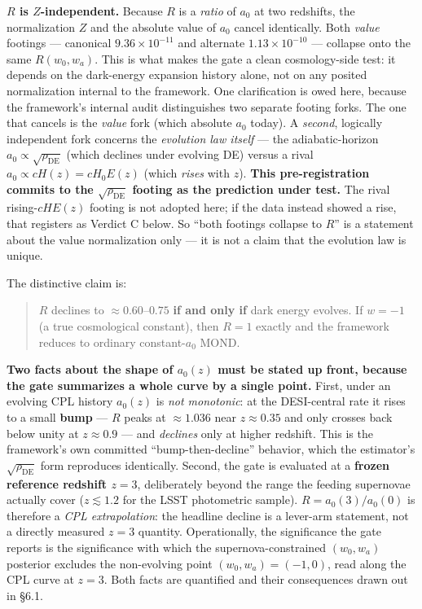 \documentclass[
]{article}
\begin{document}
\textbf{\(R\) is \(Z\)-independent.} Because \(R\) is a \emph{ratio} of
\(a_0\) at two redshifts, the normalization \(Z\) and the absolute value
of \(a_0\) cancel identically. Both \emph{value} footings --- canonical
\(9.36\times10^{-11}\) and alternate \(1.13\times10^{-10}\) --- collapse
onto the same \(R(w_0,w_a)\). This is what makes the gate a clean
cosmology-side test: it depends on the dark-energy expansion history
alone, not on any posited normalization internal to the framework. One
clarification is owed here, because the framework's internal audit
distinguishes two separate footing forks. The one that cancels is the
\emph{value} fork (which absolute \(a_0\) today). A \emph{second},
logically independent fork concerns the \emph{evolution law itself} ---
the adiabatic-horizon \(a_0\propto\sqrt{\rho_\mathrm{DE}}\) (which declines
under evolving DE) versus a rival \(a_0\propto cH(z)=cH_0E(z)\) (which
\emph{rises} with \(z\)). \textbf{This pre-registration commits to the
\(\sqrt{\rho_\mathrm{DE}}\) footing as the prediction under test.} The
rival rising-\(cH E(z)\) footing is not adopted here; if the data
instead showed a rise, that registers as Verdict C below. So ``both
footings collapse to \(R\)'' is a statement about the value
normalization only --- it is not a claim that the evolution law is
unique.

The distinctive claim is:

\begin{quote}
\(R\) declines to \(\approx 0.60\)--\(0.75\) \textbf{if and only if}
dark energy evolves. If \(w=-1\) (a true cosmological constant), then
\(R=1\) exactly and the framework reduces to ordinary constant-\(a_0\)
MOND.
\end{quote}

\textbf{Two facts about the shape of \(a_0(z)\) must be stated up front,
because the gate summarizes a whole curve by a single point.} First,
under an evolving CPL history \(a_0(z)\) is \emph{not monotonic}: at the
DESI-central rate it rises to a small \textbf{bump} --- \(R\) peaks at
\(\approx1.036\) near \(z\approx0.35\) and only crosses back below unity
at \(z\approx0.9\) --- and \emph{declines} only at higher redshift. This
is the framework's own committed ``bump-then-decline'' behavior, which
the estimator's \(\sqrt{\rho_\mathrm{DE}}\) form reproduces identically.
Second, the gate is evaluated at a \textbf{frozen reference redshift
\(z=3\)}, deliberately beyond the range the feeding supernovae actually
cover (\(z\lesssim1.2\) for the LSST photometric sample).
\(R=a_0(3)/a_0(0)\) is therefore a \emph{CPL extrapolation}: the
headline decline is a lever-arm statement, not a directly measured
\(z=3\) quantity. Operationally, the significance the gate reports is
the significance with which the supernova-constrained \((w_0,w_a)\)
posterior excludes the non-evolving point \((w_0,w_a)=(-1,0)\), read
along the CPL curve at \(z=3\). Both facts are quantified and their
consequences drawn out in §6.1.
\end{document}
